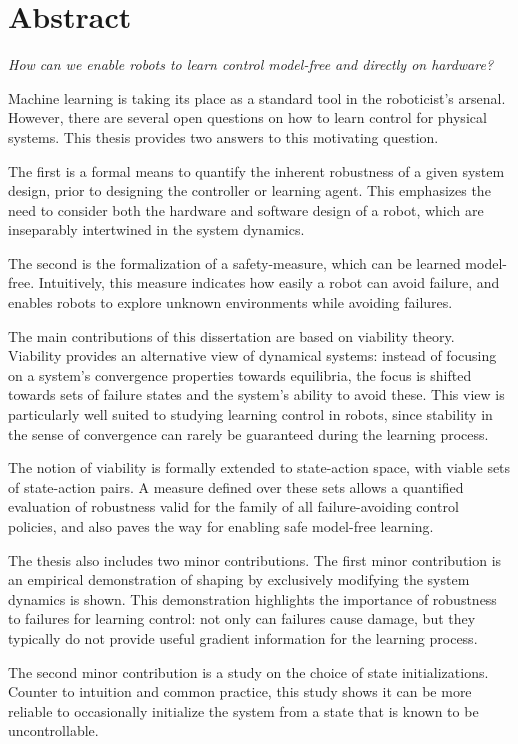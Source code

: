 
\chapter*{Abstract}
\emph{How can we enable robots to learn control model-free and directly on hardware?} \par
Machine learning is taking its place as a standard tool in the roboticist's arsenal. However, there are several open questions on how to learn control for physical systems. This thesis provides two answers to this motivating question. \par
The first is a formal means to quantify the inherent robustness of a given system design, prior to designing the controller or learning agent. This emphasizes the need to consider both the hardware and software design of a robot, which are inseparably intertwined in the system dynamics. \par
The second is the formalization of a safety-measure, which can be learned model-free. Intuitively, this measure indicates how easily a robot can avoid failure, and enables robots to explore unknown environments while avoiding failures. \par
The main contributions of this dissertation are based on viability theory. Viability provides an alternative view of dynamical systems: instead of focusing on a system's convergence properties towards equilibria, the focus is shifted towards sets of failure states and the system's ability to avoid these. This view is particularly well suited to studying learning control in robots, since stability in the sense of convergence can rarely be guaranteed during the learning process. \par
The notion of viability is formally extended to state-action space, with viable sets of state-action pairs. A measure defined over these sets allows a quantified evaluation of robustness valid for the family of all failure-avoiding control policies, and also paves the way for enabling safe model-free learning. \par
The thesis also includes two minor contributions. The first minor contribution is an empirical demonstration of shaping by exclusively modifying the system dynamics is shown. This demonstration highlights the importance of robustness to failures for learning control: not only can failures cause damage, but they typically do not provide useful gradient information for the learning process. \par
The second minor contribution is a study on the choice of state initializations. Counter to intuition and common practice, this study shows it can be more reliable to occasionally initialize the system from a state that is known to be uncontrollable. 